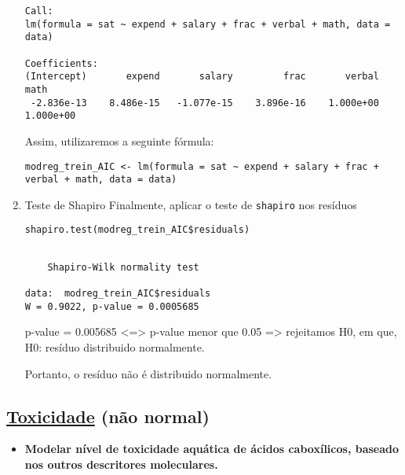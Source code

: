 \documentclass[11pt]{article}
\begin{document}
\begin{enumerate}
\begin{verbatim}
Call:
lm(formula = sat ~ expend + salary + frac + verbal + math, data = data)

Coefficients:
(Intercept)       expend       salary         frac       verbal         math  
 -2.836e-13    8.486e-15   -1.077e-15    3.896e-16    1.000e+00    1.000e+00  

\end{verbatim}

Assim, utilizaremos a seguinte fórmula:
\begin{verbatim}
modreg_trein_AIC <- lm(formula = sat ~ expend + salary + frac + verbal + math, data = data)
\end{verbatim}

\item Teste de Shapiro
\label{sec:orgb46470c}
Finalmente, aplicar o teste de \texttt{shapiro} nos resíduos

\begin{verbatim}
shapiro.test(modreg_trein_AIC$residuals)
\end{verbatim}

\begin{verbatim}

	Shapiro-Wilk normality test

data:  modreg_trein_AIC$residuals
W = 0.9022, p-value = 0.0005685

\end{verbatim}


p-value = 0.005685 <=> p-value menor que 0.05 => rejeitamos H0, em que, H0: resíduo distribuido normalmente.

Portanto, o resíduo não é distribuido normalmente.
\end{enumerate}

\subsection{\href{https://r-data.pmagunia.com/dataset/r-dataset-package-robustbase-toxicity}{Toxicidade} (não normal)}
\label{sec:org44bd4d6}
\begin{itemize}
\item \textbf{Modelar nível de toxicidade aquática de ácidos caboxílicos, baseado nos outros descritores moleculares.}
\end{itemize}
\end{document}
